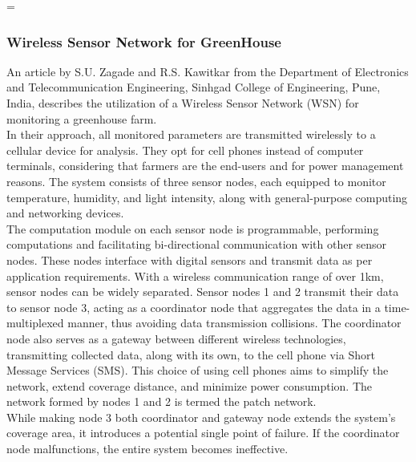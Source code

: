 =\documentclass[12pt, a4paper]{article}
\begin{document}
\subsubsection{Wireless Sensor Network for GreenHouse}
An article by S.U. Zagade and R.S. Kawitkar  \cite{zagade2012wireless} from the Department of Electronics and Telecommunication Engineering, Sinhgad College of Engineering, Pune, India, describes the utilization of a Wireless Sensor Network (WSN) for monitoring a greenhouse farm.\\
In their approach, all monitored parameters are transmitted wirelessly to a cellular device for analysis. They opt for cell phones instead of computer terminals, considering that farmers are the end-users and for power management reasons. The system consists of three sensor nodes, each equipped to monitor temperature, humidity, and light intensity, along with general-purpose computing and networking devices.\\
The computation module on each sensor node is programmable, performing computations and facilitating bi-directional communication with other sensor nodes. These nodes interface with digital sensors and transmit data as per application requirements. With a wireless communication range of over 1km, sensor nodes can be widely separated. Sensor nodes 1 and 2 transmit their data to sensor node 3, acting as a coordinator node that aggregates the data in a time-multiplexed manner, thus avoiding data transmission collisions. The coordinator node also serves as a gateway between different wireless technologies, transmitting collected data, along with its own, to the cell phone via Short Message Services (SMS). This choice of using cell phones aims to simplify the network, extend coverage distance, and minimize power consumption. The network formed by nodes 1 and 2 is termed the patch network.\\
While making node 3 both coordinator and gateway node extends the system's coverage area, it introduces a potential single point of failure. If the coordinator node malfunctions, the entire system becomes ineffective.
\end{document}
